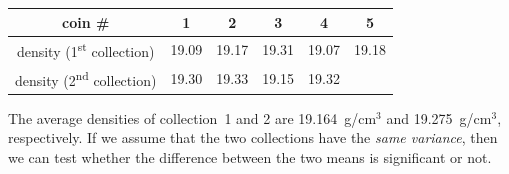 \begin{center}
\begin{tabular}{c|ccccc}
  coin \# & 1 & 2 & 3 & 4 & 5 \\ \hline
  density (1\textsuperscript{st} collection) &
  19.09 & 19.17 & 19.31 & 19.07 & 19.18 \\
  density (2\textsuperscript{nd} collection) &
  19.30 & 19.33 & 19.15 & 19.32
  \label{tab:2setcoins}
\end{tabular}
\end{center}

The average densities of collection~1 and 2 are 19.164~g/cm$^3$ and
19.275~g/cm$^3$, respectively. If we assume that the two collections
have the \textit{same variance}, then we can test whether the
difference between the two means is significant or not.

